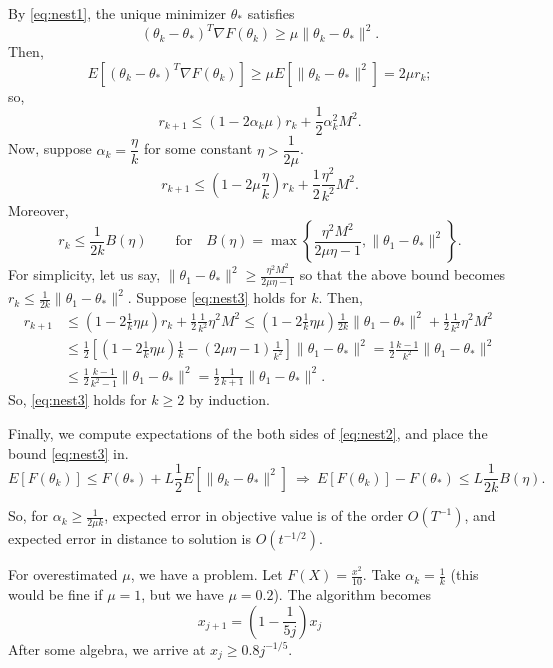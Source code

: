 \documentclass{article}
\begin{document}
\noindent
By \eqref{eq:nest1}, the unique minimizer $\theta_\ast$ satisfies
\[
 (\theta_k - \theta_\ast)^T\nabla F(\theta_k) \geq \mu\|\theta_k - \theta_\ast\|^2.
\]
Then,
\[
 E[(\theta_k-\theta_\ast)^T\nabla F(\theta_k)] \geq \mu E[\|\theta_k - \theta_\ast\|^2] = 2\mu r_k;
\]
so,
\[
 r_{k+1} \leq (1-2\alpha_k\mu)r_k + \frac{1}{2}\alpha_k^2M^2.
\]
Now, suppose $\alpha_k = \dfrac{\eta}{k}$ for some constant $\eta > \dfrac{1}{2\mu}$. 
\[
 r_{k+1} \leq (1-2\mu\frac{\eta}{k})r_k + \frac{1}{2}\frac{\eta^2}{k^2}M^2.
\]
Moreover, 
\begin{equation}
r_k\leq \frac{1}{2k}B(\eta) \qquad\mbox{for} \quad B(\eta)=\max\left\lbrace\frac{\eta^2M^2}{2\mu\eta-1},\|\theta_1-\theta_\ast\|^2\right\rbrace.
\label{eq:nest3}
\end{equation}
For simplicity, let us say, $\|\theta_1-\theta_\ast\|^2 \geq \frac{\eta^2M^2}{2\mu\eta-1}$ so that the above bound becomes $r_k\leq \frac{1}{2k}\|\theta_1-\theta_\ast\|^2$.  Suppose \eqref{eq:nest3} holds for $k$.  Then,
\begin{align*}
 r_{k+1} &\leq (1-2\frac{1}{k}\eta\mu)r_k + \frac{1}{2}\frac{1}{k^2}\eta^2M^2 \leq (1-2\frac{1}{k}\eta\mu)\frac{1}{2k}\|\theta_1-\theta_\ast\|^2 + \frac{1}{2}\frac{1}{k^2}\eta^2M^2 \\
 &\leq \frac{1}{2}\left[(1-2\frac{1}{k}\eta\mu)\frac{1}{k}-(2\mu\eta-1)\frac{1}{k^2}\right]\|\theta_1-\theta_\ast\|^2 = \frac{1}{2}\frac{k-1}{k^2}\|\theta_1-\theta_\ast\|^2 \\
 &\leq \frac{1}{2} \frac{k-1}{k^2-1} \|\theta_1-\theta_\ast\|^2 = \frac{1}{2} \frac{1}{k+1} \|\theta_1-\theta_\ast\|^2.
\end{align*}
So, \eqref{eq:nest3} holds for $k\geq 2$ by induction.  

\noindent
Finally, we compute expectations of the both sides of \eqref{eq:nest2}, and place the bound \eqref{eq:nest3} in.
\[
 E[F(\theta_k)] \leq F(\theta_\ast) + L\frac{1}{2}E[\|\theta_k-\theta_\ast\|^2] \ \Rightarrow \ E[F(\theta_k)] - F(\theta_\ast) \leq L \frac{1}{2k}B(\eta).
\]

So, for $\alpha_k \geq \frac{1}{ 2 \mu  k }$,  expected error in objective value is of the order $O(T^{-1})$, and expected error in distance to solution is $O(t^{-1/2})$.

For overestimated $\mu$, we have a problem. Let $F(X) = \frac{x^2}{10}$. Take $\alpha_k = \frac{1}{k}$ (this would be fine if $\mu=1$, but we have $\mu = 0.2$).
The algorithm becomes 
\[
	x_{j+1} = (1- \frac{1}{5j} ) x_{j}
\]
After some algebra, we arrive at $x_j \geq 0.8 j ^{-1/5}$.
\end{document}
